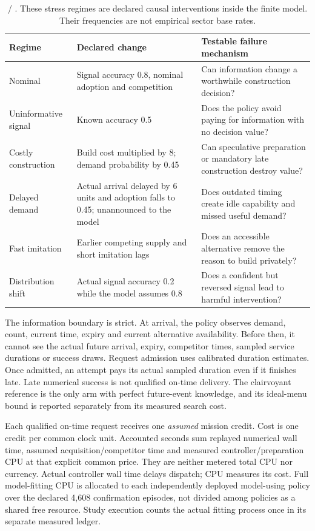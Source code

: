 \begin{table}[ht]\centering\small
\begin{tabularx}{\linewidth}{@{}L{34mm}YY@{}}\toprule
Regime & Declared change & Testable failure mechanism \\\midrule
Nominal & Signal accuracy 0.8, nominal adoption and competition & Can information change a worthwhile construction decision? \\
Uninformative signal & Known accuracy 0.5 & Does the policy avoid paying for information with no decision value? \\
Costly construction & Build cost multiplied by 8; demand probability by 0.45 & Can speculative preparation or mandatory late construction destroy value? \\
Delayed demand & Actual arrival delayed by 6 units and adoption falls to 0.45; unannounced to the model & Does outdated timing create idle capability and missed useful demand? \\
Fast imitation & Earlier competing supply and short imitation lags & Does an accessible alternative remove the reason to build privately? \\
Distribution shift & Actual signal accuracy 0.2 while the model assumes 0.8 & Does a confident but reversed signal lead to harmful intervention? \\\bottomrule
\end{tabularx}
\caption{\assum{} / \simu{}. These stress regimes are declared causal interventions inside the finite model. Their frequencies are not empirical sector base rates.}
\label{tab:regimes}\end{table}

The information boundary is strict. At arrival, the policy observes demand, count, current time, expiry and current alternative availability. Before then, it cannot see the actual future arrival, expiry, competitor times, sampled service durations or success draws. Request admission uses calibrated duration estimates. Once admitted, an attempt pays its actual sampled duration even if it finishes late. Late numerical success is not qualified on-time delivery. The clairvoyant reference is the only arm with perfect future-event knowledge, and its ideal-menu bound is reported separately from its measured search cost.

Each qualified on-time request receives one \emph{assumed} mission credit. Cost is one credit per common clock unit. Accounted seconds sum replayed numerical wall time, assumed acquisition/competitor time and measured controller/preparation CPU at that explicit common price. They are neither metered total CPU nor currency. Actual controller wall time delays dispatch; CPU measures its cost. Full model-fitting CPU is allocated to each independently deployed model-using policy over the declared 4,608 confirmation episodes, not divided among policies as a shared free resource. Study execution counts the actual fitting process once in its separate measured ledger.

